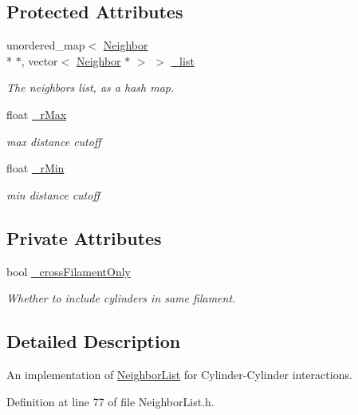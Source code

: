 \subsection*{Protected Attributes}
\begin{DoxyCompactItemize}
\item 
unordered\+\_\+map$<$ \hyperlink{classNeighbor}{Neighbor} \\*
$\ast$, vector$<$ \hyperlink{classNeighbor}{Neighbor} $\ast$ $>$ $>$ \hyperlink{classNeighborList_af09da5281bc352cf028e39276ba5b68f}{\+\_\+list}
\begin{DoxyCompactList}\small\item\em The neighbors list, as a hash map. \end{DoxyCompactList}\item 
float \hyperlink{classNeighborList_a94d5215ec2f93c2191cd0ca87e062c5e}{\+\_\+r\+Max}
\begin{DoxyCompactList}\small\item\em max distance cutoff \end{DoxyCompactList}\item 
float \hyperlink{classNeighborList_a5fc2a03a950ca3867920527410ee8aa0}{\+\_\+r\+Min}
\begin{DoxyCompactList}\small\item\em min distance cutoff \end{DoxyCompactList}\end{DoxyCompactItemize}
\subsection*{Private Attributes}
\begin{DoxyCompactItemize}
\item 
bool \hyperlink{classCylinderNeighborList_aa43a77d156819bcfdef9285eeab98d92}{\+\_\+cross\+Filament\+Only}
\begin{DoxyCompactList}\small\item\em Whether to include cylinders in same filament. \end{DoxyCompactList}\end{DoxyCompactItemize}


\subsection{Detailed Description}
An implementation of \hyperlink{classNeighborList}{Neighbor\+List} for Cylinder-\/\+Cylinder interactions. 

Definition at line 77 of file Neighbor\+List.\+h.




